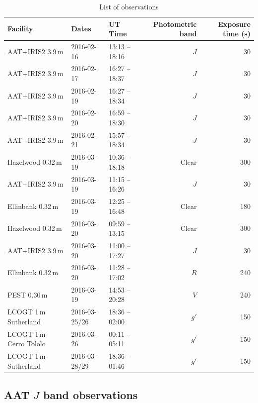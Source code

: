 \documentclass[apj]{emulateapj}
\begin{document}
\begin{table}
\centering
\caption{\label{tab:observations}List of observations}
\begin{tabular}{lllrr}
\hline\hline
Facility & Dates & UT Time & Photometric band & Exposure time (s) \\
\hline
AAT+IRIS2 3.9\,m & 2016-02-16 & 13:13 -- 18:16 & $J$ & 30 \\
AAT+IRIS2 3.9\,m & 2016-02-17 & 16:27 -- 18:37 & $J$ & 30 \\
AAT+IRIS2 3.9\,m & 2016-02-19 & 16:27 -- 18:34 & $J$ & 30 \\
AAT+IRIS2 3.9\,m & 2016-02-20 & 16:59 -- 18:30 & $J$ & 30 \\
AAT+IRIS2 3.9\,m & 2016-02-21 & 15:57 -- 18:34 & $J$ & 30 \\
Hazelwood 0.32\,m & 2016-03-19 & 10:36 -- 18:18 & Clear & 300 \\
AAT+IRIS2 3.9\,m & 2016-03-19 & 11:15 -- 16:26 & $J$ & 30 \\
Ellinbank 0.32\,m & 2016-03-19 & 12:25 -- 16:48 & Clear & 180 \\
Hazelwood 0.32\,m & 2016-03-20 & 09:59 -- 13:15 & Clear & 300 \\
AAT+IRIS2 3.9\,m & 2016-03-20 & 11:00 -- 17:27 & $J$ & 30 \\
Ellinbank 0.32\,m & 2016-03-20 & 11:28 -- 17:02 & $R$ & 240 \\
PEST 0.30\,m & 2016-03-19 & 14:53 -- 20:28 & $V$ & 240 \\
LCOGT 1\,m Sutherland & 2016-03-25/26 & 18:36 -- 02:00 & $g'$ & 150 \\
LCOGT 1\,m Cerro Tololo & 2016-03-26 & 00:11 -- 05:11 & $g'$ & 150 \\
LCOGT 1\,m Sutherland & 2016-03-28/29 & 18:36 -- 01:46 & $g'$ & 150 \\
\hline
\end{tabular}
\end{table}

\subsection{AAT $J$ band observations}
\label{sec:obs_aat}
\end{document}
